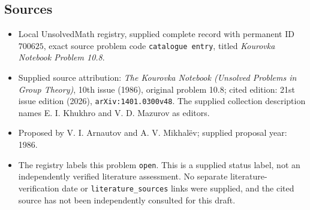 \documentclass[11pt]{article}
\begin{document}
\subsection{Sources}
\begin{itemize}
\item Local UnsolvedMath registry, supplied complete record with permanent ID \(700625\), exact source problem code \texttt{catalogue entry}, titled \emph{Kourovka Notebook Problem 10.8}.
\item Supplied source attribution: \emph{The Kourovka Notebook (Unsolved Problems in Group Theory)}, 10th issue (1986), original problem 10.8; cited edition: 21st issue edition (2026), \texttt{arXiv:1401.0300v48}. The supplied collection description names E. I. Khukhro and V. D. Mazurov as editors.
\item Proposed by V. I. Arnautov and A. V. Mikhal\"ev; supplied proposal year: 1986.
\item The registry labels this problem \texttt{open}. This is a supplied status label, not an independently verified literature assessment. No separate literature-verification date or \texttt{literature\_sources} links were supplied, and the cited source has not been independently consulted for this draft.
\end{itemize}
\end{document}
